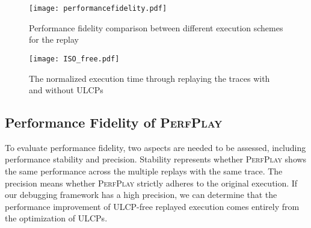 \begin{figure}[tbp] \centering
\texttt{[image: performancefidelity.pdf]}
\caption{Performance fidelity comparison between different execution schemes for the replay}
\label{fig:performancefidelity}
\end{figure}
\begin{figure}
\centering
\texttt{[image: ISO\_free.pdf]}
\caption{The normalized execution time through replaying the traces with and without ULCPs}
\label{fig:overlap}
\end{figure}
\begin{comment}
\begin{table}[tbp]   \centering
\small
\caption{The proportional optimization range of the ISO performance regions for all ten sets of input data. For example, "2-5" column shows the performance proportion range of the identified regions appearing in 2-5 input after the optimization for each input.}
\begin{tabular}{|c|c|c|c|c|}\Xhline{1pt}
\multirow{2}{*}{\textbf{Application}}&\multicolumn{4}{|c|}{\textbf{Relative opt-proportion}}  \\ \cline{2-5}
  & \textbf{Single}&\textbf{2-5}&\textbf{6-9}&\textbf{All} \\ \hline \hline
  OpenLDAP&0&9.2-11.3\%&13.5-24.8\%&57.8-79.8\% \\
  MySQL&0.7-1.1\%&8.9-15.2\%&7.5-24.9\% &62.2-76.3\% \\ \hline
  pbzip2&0.3-0.9\%&2.7-6.5\%&19.2-25.3\% &78.1-84.2\% \\
  TransmissionBT&0&3.1-6.8\%&18.9-28.4\% &65.6-76.3\% \\
  Handbrake&0&11.7-19.9\%&26.7-36.6\% &51.5-72.1\% \\ \hline
  blacksholes&0&0&0 &0 \\
  bodytrack&1.7-3.4\%&5.9-9.8\%&11.4-30.4\%&71.2-84.5\% \\
  facesim&0&5.2-18.4\%&13.2-28.9\% &67.4-81.1\% \\
  fluidanimate&0&6.4-18.2&11.1-32.1&59.3-79.9\% \\
  swaptions&0&0&0 &0 \\ \Xhline{1pt}
\end{tabular}
\label{table:region}
\end{table}
\end{comment}
\subsection{Performance Fidelity of \textsc{PerfPlay}}
\label{sec:perf:fidelity}
To evaluate performance fidelity, two aspects are needed to be assessed, including performance stability and precision. Stability represents whether \textsc{PerfPlay} shows the same performance across the multiple replays with the same trace. The precision means whether \textsc{PerfPlay} strictly adheres to the original execution. If our debugging framework has a high precision, we can determine that the performance improvement of ULCP-free replayed execution comes entirely from the optimization of ULCPs.

